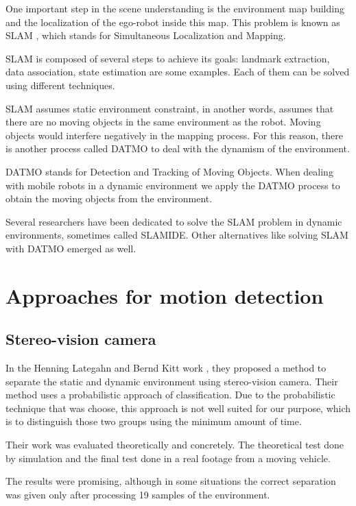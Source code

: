 One important step in the scene understanding is the environment map building and the localization of the ego-robot inside this map. This problem is known as SLAM \cite{Leonard2002Mobile} \cite{qadeerthesis}, which stands for Simultaneous Localization and  Mapping.

SLAM is composed of several steps to achieve its goals: landmark extraction, data association, state estimation are some examples. Each of them can be solved using different techniques.

SLAM assumes static environment constraint, in another words, assumes that there are no moving objects in the same environment as the robot. Moving objects would interfere negatively in the mapping process. For this reason, there is another process called DATMO to deal with the dynamism of the environment.

DATMO stands for Detection and Tracking of Moving Objects. When dealing with mobile robots in a dynamic environment we apply the DATMO process to obtain the moving objects from the environment.

Several researchers have been dedicated to solve the SLAM problem in dynamic environments, sometimes called SLAMIDE\cite{bibbyrss07}. Other alternatives like solving SLAM with DATMO\cite{Wang02simultaneouslocalization} emerged as well.

\section{Approaches for motion detection}

\subsection{Stereo-vision camera}

In the Henning Lategahn and Bernd Kitt work \cite{DBLP:conf/ivs/LategahnGHKE11}, they proposed a method to separate the static and dynamic environment using stereo-vision camera. Their method uses a probabilistic approach of classification. Due to the probabilistic technique that was choose, this approach is not well suited for our purpose, which is to distinguish those two groups using the minimum amount of time.

Their work was evaluated theoretically and concretely. The theoretical test done by simulation and the final test done in a real footage from a moving vehicle.

The results were promising, although in some situations the correct separation was given only after processing 19 samples of the environment. 

